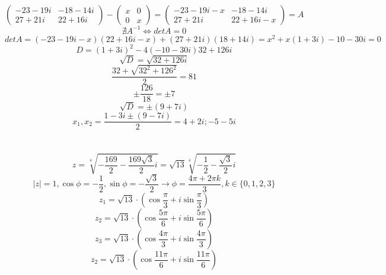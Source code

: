 

	\section{}
	$$\begin{pmatrix}
		-23-19i & -18-14i \\
		27+21i & 22 +16i 
	\end{pmatrix} - \begin{pmatrix}
	x & 0 \\
	0 & x
	\end{pmatrix} = \begin{pmatrix}
	-23-19i-x & -18-14i \\
	27+21i & 22 +16i-x 
	\end{pmatrix} = A $$
	$$\nexists A^{-1}\iff det A = 0$$
	$$det A = (-23-19i-x)(22+16i-x)+(27+21i)(18+14i) = x^2+x(1+3i)-10-30i = 0$$
	$$D = (1+3i)^2 -4(-10-30i) 32 + 126i$$
	$$\sqrt{D} = \sqrt{32+126i}$$
	$$\frac{32+\sqrt{32^2+126^2}}{2} = 81$$
	$$\pm\frac{126}{18} = \pm7$$
	$$\sqrt{D} = \pm(9+7i)$$
	$$x_1,x_2 = \frac{1-3i\pm(9-7i)}{2} = 4+2i;-5-5i$$
\section{}
$$z = \sqrt[4]{-\frac{169}{2}-\frac{169\sqrt3}{2}i} =  \sqrt{13}\sqrt[4]{-\frac{1}{2}-\frac{\sqrt3}{2}i}$$
$$|z| = 1, \cos{\phi} = -\frac12, \sin{\phi} = -\frac{\sqrt3}{2} \to \phi = \frac{4\pi+2\pi k}{3},k \in \{0,1,2,3\}$$
$$z_1 = \sqrt{13}\cdot(\cos{ \frac{\pi}{3}} +i\sin{ \frac{\pi}{3}})$$
$$z_2 = \sqrt{13}\cdot(\cos{ \frac{5\pi}{6}} +i\sin{\frac{5\pi}{6}})$$
$$z_3 = \sqrt{13}\cdot(\cos{ \frac{4\pi}{3}} +i\sin{\frac{4\pi}{3}})$$
$$z_2 = \sqrt{13}\cdot(\cos{ \frac{11\pi}{6}} +i\sin{\frac{11\pi}{6}})$$
